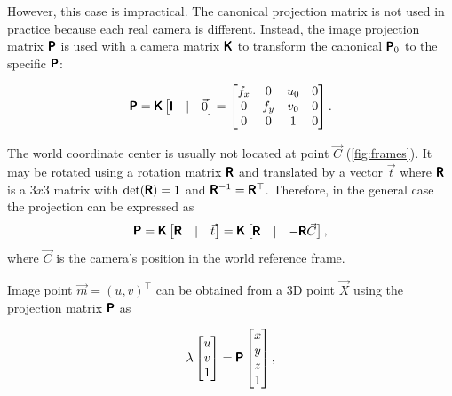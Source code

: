 However, this case is impractical. 
The canonical projection matrix is not used in practice because each real camera is different. 
Instead, the image projection matrix $\pmb{\mathsf{P}}$ is used with a camera matrix $\pmb{\mathsf{K}}$ to transform the canonical $\pmb{\mathsf{P}}_0$ to the specific $\pmb{\mathsf{P}}$:

\begin{equation}
\pmb{\mathsf{P}} = \pmb{\mathsf{K}} \begin{bmatrix} \pmb{\mathsf{I}} & | & \vec{0} \end{bmatrix} = 
    \begin{bmatrix} 
    f_x & 0 & u_0 & 0 \\
    0 & f_y & v_0 & 0 \\ 
    0 & 0 & 1 & 0 \\
    \end{bmatrix}.
\end{equation}

The world coordinate center is usually not located at point $\vec{C}$ (\autoref{fig:frames}). 
It may be rotated using a rotation matrix $\pmb{\mathsf{R}}$ and translated by a vector $\vec{t}$ where $\pmb{\mathsf{R}}$ is a $3x3$ matrix with $\det(\pmb{\mathsf{R}}) = 1$ and $\pmb{\mathsf{R}}^{-1} = \pmb{\mathsf{R}}^\top$. 
Therefore, in the general case the projection can be expressed as
\begin{equation}
    \label{eq:PKRt}
    \pmb{\mathsf{P}} = \pmb{\mathsf{K}} \begin{bmatrix} \pmb{\mathsf{R}} & | & \vec{t} \end{bmatrix} = 
    \pmb{\mathsf{K}} \begin{bmatrix} \pmb{\mathsf{R}} & | & - \pmb{\mathsf{R}} \vec{C} \end{bmatrix},
\end{equation}
where $\vec{C}$ is the camera's position in the world reference frame. 

Image point $\vec{m} = (u, v)^\top$ can be obtained from a 3D point $\vec{X}$ using the projection matrix $\pmb{\mathsf{P}}$ as

\begin{equation}
    \label{eq:projection}
    \lambda \begin{bmatrix} 
        u \\ v \\ 1 \end{bmatrix} = \pmb{\mathsf{P}} \begin{bmatrix} x \\ y \\ z \\ 1
    \end{bmatrix},
\end{equation}

